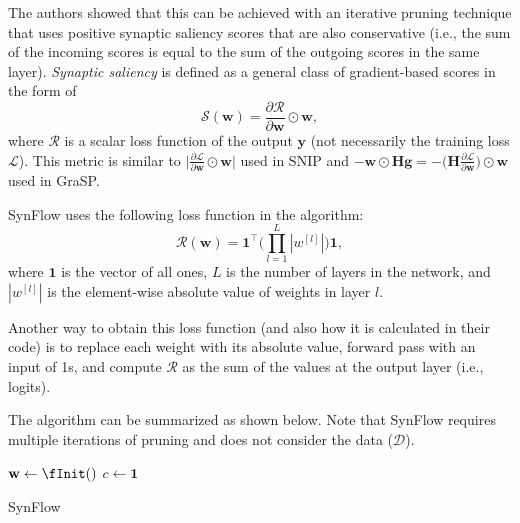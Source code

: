 The authors showed that this can be achieved with an iterative pruning technique that uses positive synaptic saliency scores that are also conservative (i.e., the sum of the incoming scores is equal to the sum of the outgoing scores in the same layer). \textit{Synaptic saliency} is defined as a general class of gradient-based scores in the form of
$$\mathcal{S}(\textbf{w}) = \frac{\partial \mathcal{R}}{\partial \textbf{w}} \odot \textbf{w},$$
where $\mathcal{R}$ is a scalar loss function of the output $\textbf{y}$ (not necessarily the training loss $\mathcal{L}$). This metric is similar to $\big|\frac{\partial \mathcal{L}}{\partial \textbf{w}} \odot \textbf{w}\big|$ used in SNIP and $- \textbf{w} \odot \textbf{Hg} = -\big(\textbf{H}\frac{\partial \mathcal{L}}{\partial \textbf{w}} \big) \odot \textbf{w}$ used in GraSP.

SynFlow uses the following loss function in the algorithm:
$$\mathcal{R}(\textbf{w}) = \mathbf{1}^\top \Big( \prod_{l=1}^L |w^{[l]}| \Big) \mathbf{1},$$
where $\mathbf{1}$ is the vector of all ones, $L$ is the number of layers in the network, and $|w^{[l]}|$ is the element-wise absolute value of weights in layer $l$.

Another way to obtain this loss function (and also how it is calculated in their code) is to replace each weight with its absolute value, forward pass with an input of 1s, and compute $\mathcal{R}$ as the sum of the values at the output layer (i.e., logits).

The algorithm can be summarized as shown below. Note that SynFlow requires multiple iterations of pruning and does not consider the data ($\mathcal{D}$).
\begin{algorithm}[!h]
\AlgoFontSize
\DontPrintSemicolon


\BlankLine
$\textbf{w} \gets \fInit()$\;
$c \gets \mathbf{1}$ 
\caption{SynFlow}
\label{SynFlow:algo}
\end{algorithm}

